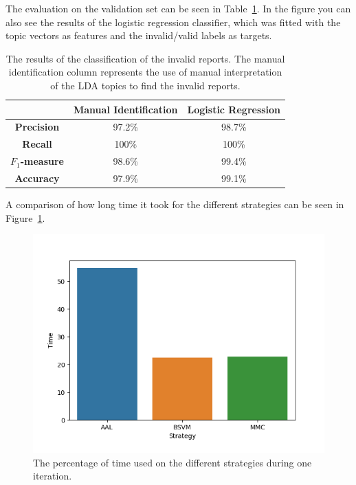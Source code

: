 The evaluation on the validation set can be seen in Table~\ref{tab:exp1-eval}.
In the figure you can also see the results of the logistic regression classifier, which was fitted with the topic vectors as features and the invalid/valid labels as targets.

\begin{table}[h!]
    \centering
    \begin{tabular}{|c|cc|}
        \hline
        & \textbf{Manual Identification} & \textbf{Logistic Regression} \\
        \hline
        \textbf{Precision} & 97.2\% & 98.7\% \\
        \textbf{Recall} & 100\% & 100\% \\
        \textbf{$F_1$-measure} & 98.6\% & 99.4\%\\
        \textbf{Accuracy} & 97.9\% & 99.1\%\\
        \hline
    \end{tabular}
    \caption{The results of the classification of the invalid reports. The manual identification column represents the use of manual interpretation of the LDA topics to find the invalid reports.}
    \label{tab:exp1-eval}
\end{table}

A comparison of how long time it took for the different strategies can be seen in Figure~\ref{fig:al-time-dist}.

\begin{figure}[!ht]
    \centering
    \includegraphics[width=\textwidth]{figures/time-distribution.png}
    \caption{The percentage of time used on the different strategies during one iteration.}
    \label{fig:al-time-dist}
\end{figure}

